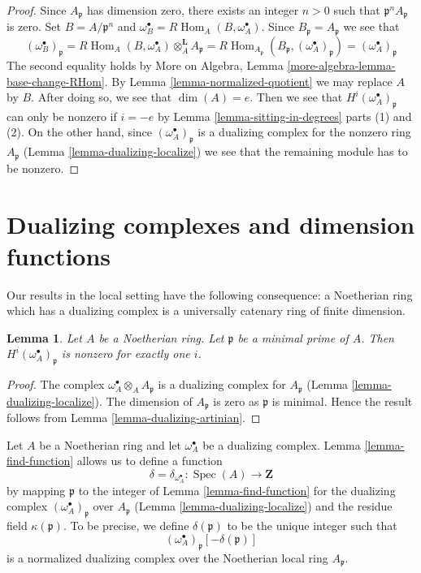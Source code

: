 \documentclass{stacks-project}
\theoremstyle{plain}
\newtheorem{lemma}[subsection]{Lemma}
\theoremstyle{definition}
\theoremstyle{remark}
\numberwithin{equation}{subsection}
\def\Spec{\mathop{\mathrm{Spec}}}
\def\Hom{\mathop{\mathrm{Hom}}\nolimits}
\begin{document}
\begin{proof}
Since $A_\mathfrak p$ has dimension zero, there exists an integer
$n > 0$ such that $\mathfrak p^nA_\mathfrak p$ is zero.
Set $B = A/\mathfrak p^n$ and
$\omega_B^\bullet = R\Hom_A(B, \omega_A^\bullet)$.
Since $B_\mathfrak p = A_\mathfrak p$ we see that
$$
(\omega_B^\bullet)_\mathfrak p =
R\Hom_A(B, \omega_A^\bullet) \otimes_A^\mathbf{L} A_\mathfrak p =
R\Hom_{A_\mathfrak p}(B_\mathfrak p, (\omega_A^\bullet)_\mathfrak p) =
(\omega_A^\bullet)_\mathfrak p
$$
The second equality holds by
More on Algebra, Lemma \ref{more-algebra-lemma-base-change-RHom}.
By Lemma \ref{lemma-normalized-quotient} we may replace $A$ by $B$.
After doing so, we see that $\dim(A) = e$. Then we see that
$H^i(\omega_A^\bullet)_\mathfrak p$ can only be nonzero if $i = -e$
by Lemma \ref{lemma-sitting-in-degrees} parts (1) and (2).
On the other hand, since $(\omega_A^\bullet)_\mathfrak p$
is a dualizing complex for the nonzero ring $A_\mathfrak p$
(Lemma \ref{lemma-dualizing-localize})
we see that the remaining module has to be nonzero.
\end{proof}





\section{Dualizing complexes and dimension functions}
\label{section-dimension-function}

\noindent
Our results in the local setting have the following consequence:
a Noetherian ring which has a dualizing complex is a
universally catenary ring of finite dimension.

\begin{lemma}
\label{lemma-nonvanishing-generically}
Let $A$ be a Noetherian ring. Let $\mathfrak p$ be a minimal prime
of $A$. Then $H^i(\omega_A^\bullet)_\mathfrak p$ is nonzero
for exactly one $i$.
\end{lemma}

\begin{proof}
The complex $\omega_A^\bullet \otimes_A A_\mathfrak p$
is a dualizing complex for $A_\mathfrak p$
(Lemma \ref{lemma-dualizing-localize}).
The dimension of $A_\mathfrak p$ is zero as $\mathfrak p$
is minimal. Hence the result follows from
Lemma \ref{lemma-dualizing-artinian}.
\end{proof}

\noindent
Let $A$ be a Noetherian ring and let $\omega_A^\bullet$ be a dualizing
complex. Lemma \ref{lemma-find-function} allows us to define a function
$$
\delta = \delta_{\omega_A^\bullet} : \Spec(A) \longrightarrow \mathbf{Z}
$$
by mapping $\mathfrak p$ to the integer of Lemma \ref{lemma-find-function}
for the dualizing complex $(\omega_A^\bullet)_\mathfrak p$
over $A_\mathfrak p$ (Lemma \ref{lemma-dualizing-localize})
and the residue field $\kappa(\mathfrak p)$. To be precise, we define
$\delta(\mathfrak p)$ to be the unique integer such that
$$
(\omega_A^\bullet)_\mathfrak p[-\delta(\mathfrak p)]
$$
is a normalized dualizing complex over the Noetherian local ring
$A_\mathfrak p$.
\end{document}
